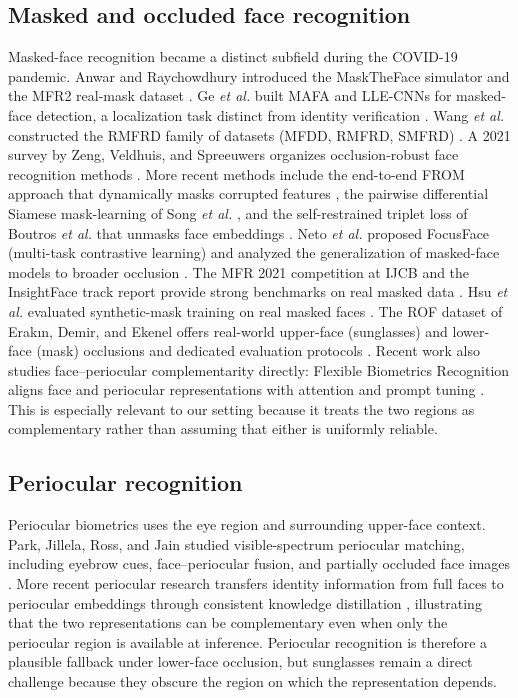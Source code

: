 \documentclass[10pt,journal,compsoc]{IEEEtran}
\begin{document}
\subsection{Masked and occluded face recognition}
Masked-face recognition became a distinct subfield during the COVID-19 pandemic. Anwar and Raychowdhury introduced the MaskTheFace simulator and the MFR2 real-mask dataset \cite{mfr2}. Ge \textit{et al.} built MAFA and LLE-CNNs for masked-face detection, a localization task distinct from identity verification \cite{llecnn}. Wang \textit{et al.} constructed the RMFRD family of datasets (MFDD, RMFRD, SMFRD) \cite{rmfrd}. A 2021 survey by Zeng, Veldhuis, and Spreeuwers organizes occlusion-robust face recognition methods \cite{surveyocc}. More recent methods include the end-to-end FROM approach that dynamically masks corrupted features \cite{from2022}, the pairwise differential Siamese mask-learning of Song \textit{et al.} \cite{masklearn}, and the self-restrained triplet loss of Boutros \textit{et al.} that unmasks face embeddings \cite{umr}. Neto \textit{et al.} proposed FocusFace (multi-task contrastive learning) \cite{focusface} and analyzed the generalization of masked-face models to broader occlusion \cite{beyondmasks}. The MFR 2021 competition at IJCB and the InsightFace track report provide strong benchmarks on real masked data \cite{mfr2021,insightfacemfr}. Hsu \textit{et al.} evaluated synthetic-mask training on real masked faces \cite{hsu2022}. The ROF dataset of Erakın, Demir, and Ekenel offers real-world upper-face (sunglasses) and lower-face (mask) occlusions and dedicated evaluation protocols \cite{rof}. Recent work also studies face--periocular complementarity directly: Flexible Biometrics Recognition aligns face and periocular representations with attention and prompt tuning \cite{fbr2024}. This is especially relevant to our setting because it treats the two regions as complementary rather than assuming that either is uniformly reliable.

\subsection{Periocular recognition}
Periocular biometrics uses the eye region and surrounding upper-face context. Park, Jillela, Ross, and Jain studied visible-spectrum periocular matching, including eyebrow cues, face--periocular fusion, and partially occluded face images \cite{periocular}. More recent periocular research transfers identity information from full faces to periocular embeddings through consistent knowledge distillation \cite{ckd2024}, illustrating that the two representations can be complementary even when only the periocular region is available at inference. Periocular recognition is therefore a plausible fallback under lower-face occlusion, but sunglasses remain a direct challenge because they obscure the region on which the representation depends.
\end{document}
